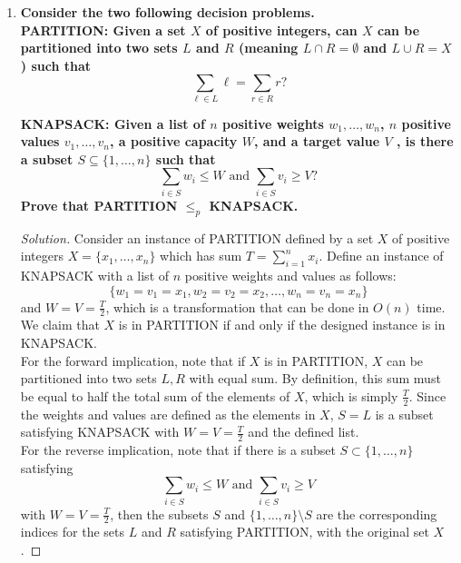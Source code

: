 \documentclass[11pt]{article}
\newenvironment{solution}
  {\renewcommand\qedsymbol{$\blacksquare$}\begin{proof}[Solution]}
  {\end{proof}}
\begin{document}
\begin{enumerate}
\newpage

\item \textbf{Consider the two following decision problems.} \\

\textbf{PARTITION: Given a set $X$ of positive integers, can $X$ can be partitioned into two sets $L$
and $R$ (meaning $L \cap R = \emptyset $  and $L \cup R = X$) such that} \[ \sum\limits_{\ell \in L} \ell = \sum\limits_{r \in R} r?\]

\textbf{KNAPSACK: Given a list of $n$ positive weights $w_1, \dots, w_n$, $n$ positive values $v_1, \dots, v_n$, a
positive capacity $W$, and a target value $V$ , is there a subset $S \subseteq \{1, \dots, n\}$ such that}
\[ \sum\limits_{i \in S} w_i \leq W \text{ and } \sum\limits_{i \in S} v_i \geq V?\]
\textbf{Prove that PARTITION $\leq_p$ KNAPSACK.}

\begin{solution}
Consider an instance of PARTITION defined by a set $X$ of positive integers $X = \{x_1, \dots, x_n\}$ which has sum $T = \sum\limits_{i=1}^n x_i.$ Define an instance of KNAPSACK with a list of $n$ positive weights and values as follows:\[ \{w_1 = v_1 = x_1, w_2 = v_2 = x_2, \dots, w_n = v_n = x_n\}\] and $W = V = \frac{T}{2}$, which is a transformation that can be done in $O(n)$ time. \\

We claim that $X$ is in PARTITION if and only if the designed instance is in KNAPSACK. \\

For the forward implication, note that if $X$ is in PARTITION, $X$ can be partitioned into two sets $L, R$ with equal sum. By definition, this sum must be equal to half the total sum of the elements of $X$, which is simply $\frac{T}{2}$. Since the weights and values are defined as the elements in $X$, $S = L$ is a subset satisfying KNAPSACK with $W = V = \frac{T}{2}$ and the defined list. \\

For the reverse implication, note that if there is a subset $S \subset \{1, \dots, n\}$ satisfying \[ \sum\limits_{i \in S} w_i \leq W \text{ and } \sum\limits_{i \in S} v_i \geq V\] with $W = V = \frac{T}{2}$, then the subsets $S$ and $\{1, \dots, n\} \setminus S$ are the corresponding indices for the sets $L$ and $R$ satisfying PARTITION, with the original set $X$. 
\end{solution}

\newpage


\end{enumerate}
\end{document}
